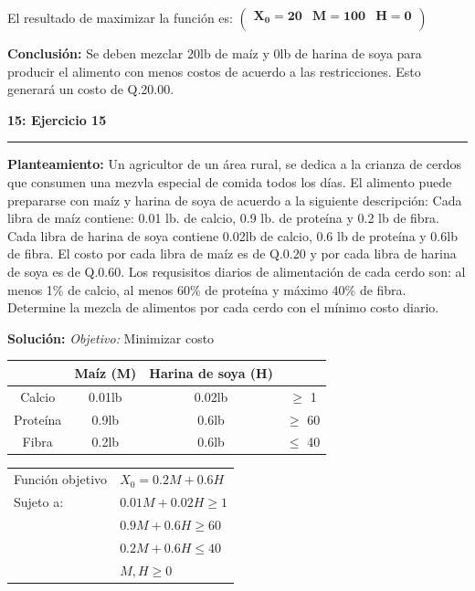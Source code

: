 \documentclass[11pt]{article}
\newcommand\problema[2]{\vspace{.01in}\textbf{#1: #2}\vspace{.5em}\hrule\vspace{.10in}}
\newcommand\planteamiento{\vspace{.10in}\textbf{Planteamiento: }}
\newcommand\solucion{\vspace{.10in}\textbf{Solución: }}
\newcommand\conclusion{\vspace{.10in}\textbf{Conclusión: }}
\newcommand\obj{\vspace{.10in}\textit{Objetivo: }}
\begin{document}
El resultado de maximizar la función es:
\begin{math}
\mathbf{\left(\begin{array}{rrr}X_0=20&M=100&H=0\\\end{array}\right)}
\end{math}

\conclusion Se deben mezclar 20lb de maíz y 0lb de harina de soya para producir el alimento con menos costos de acuerdo a las restricciones. Esto generará un costo de Q.20.00.

\pagebreak
\problema{15}{Ejercicio 15}
\planteamiento
Un agricultor de un área rural, se dedica a la crianza de cerdos que consumen una mezvla especial de comida todos los días. El alimento puede prepararse con maíz y harina de soya de acuerdo a la siguiente descripción: Cada libra de maíz contiene: 0.01 lb. de calcio, 0.9 lb. de proteína y 0.2 lb de fibra. Cada libra de harina de soya contiene 0.02lb de calcio, 0.6 lb de proteína y 0.6lb de fibra. El costo por cada libra de maíz es de Q.0.20 y por cada libra de harina de soya es de Q.0.60. Los requsisitos diarios de alimentación de cada cerdo son: al menos 1\% de calcio, al menos 60\% de proteína y máximo 40\% de fibra. Determine la mezcla de alimentos por cada cerdo con el mínimo costo diario.

\solucion
\obj Minimizar costo

\begin{tabular}{|c|c|c|c|}
\hline 
 & Maíz (M) & Harina de soya (H) &  \\ 
\hline 
Calcio & 0.01lb & 0.02lb & $\geq$ 1 \\ 
\hline 
Proteína & 0.9lb & 0.6lb & $\geq$ 60 \\ 
\hline 
Fibra & 0.2lb & 0.6lb & $\leq$ 40 \\ 
\hline 
\end{tabular}

\begin{table}[h]
\begin{tabular}{ll}
Función objetivo & $X_0 = 0.2M+0.6H$    \\
Sujeto a:        & $0.01M + 0.02H \geq 1$ \\
                 & $0.9M + 0.6H \geq 60$ \\
                 & $0.2M + 0.6H \leq 40$ \\
                 & $M,H \geq 0$    
\end{tabular}
\end{table}
\end{document}
